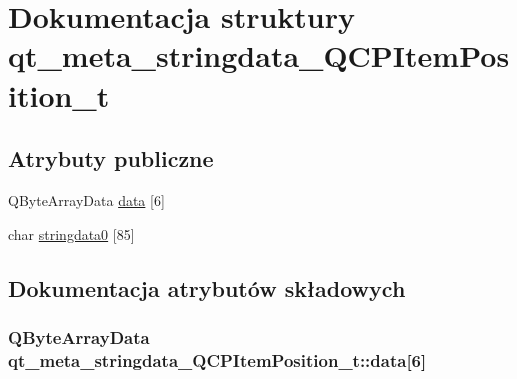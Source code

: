 \hypertarget{structqt__meta__stringdata___q_c_p_item_position__t}{}\section{Dokumentacja struktury qt\+\_\+meta\+\_\+stringdata\+\_\+\+Q\+C\+P\+Item\+Position\+\_\+t}
\label{structqt__meta__stringdata___q_c_p_item_position__t}
\subsection*{Atrybuty publiczne}
\begin{DoxyCompactItemize}
\item 
Q\+Byte\+Array\+Data \hyperlink{structqt__meta__stringdata___q_c_p_item_position__t_a7efdce6b4c431297ac7218626630d15f}{data} \mbox{[}6\mbox{]}
\item 
char \hyperlink{structqt__meta__stringdata___q_c_p_item_position__t_a0321410c49080a232c195e07eac0ea1a}{stringdata0} \mbox{[}85\mbox{]}
\end{DoxyCompactItemize}


\subsection{Dokumentacja atrybutów składowych}
\subsubsection[{\texorpdfstring{data}{data}}]{\setlength{\rightskip}{0pt plus 5cm}Q\+Byte\+Array\+Data qt\+\_\+meta\+\_\+stringdata\+\_\+\+Q\+C\+P\+Item\+Position\+\_\+t\+::data\mbox{[}6\mbox{]}}\hypertarget{structqt__meta__stringdata___q_c_p_item_position__t_a7efdce6b4c431297ac7218626630d15f}{}\label{structqt__meta__stringdata___q_c_p_item_position__t_a7efdce6b4c431297ac7218626630d15f}
